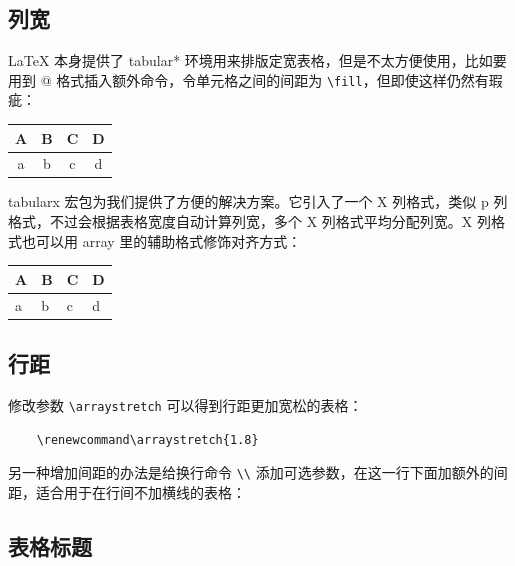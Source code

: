 \subsection{列宽}\label{sec:column-width}

\LaTeX{} 本身提供了 tabular* 环境用来排版定宽表格，但是不太方便使用，比如要用到 @ 格式插入额外命令，令单元格之间的间距为 \lstinline{\fill}，但即使这样仍然有瑕疵：

\begin{codeshow}
    \begin{tabular*}{14em}%
        {@{\extracolsep{\fill}}|c|c|c|c|}
        \hline
        A & B & C & D \\ \hline
        a & b & c & d \\ \hline
    \end{tabular*}
\end{codeshow}

tabularx 宏包为我们提供了方便的解决方案。它引入了一个 X 列格式，类似 p 列格式，不过会根据表格宽度自动计算列宽，多个 X 列格式平均分配列宽。X 列格式也可以用 array 里的辅助格式修饰对齐方式：

\begin{codeshow}
    \begin{tabularx}{14em}%
        {|*{4}{>{\centering\arraybackslash}X|}}
        \hline
        A & B & C & D \\ \hline
        a & b & c & d \\ \hline
    \end{tabularx}
\end{codeshow}

\subsection{行距}\label{sec:row-spacing}

修改参数 \lstinline{\arraystretch} 可以得到行距更加宽松的表格：
\begin{lstlisting}
    \renewcommand\arraystretch{1.8}
\end{lstlisting}

另一种增加间距的办法是给换行命令 \lstinline|\\| 添加可选参数，在这一行下面加额外的间距，适合用于在行间不加横线的表格：


\subsection{表格标题}\label{sec:table-title}

